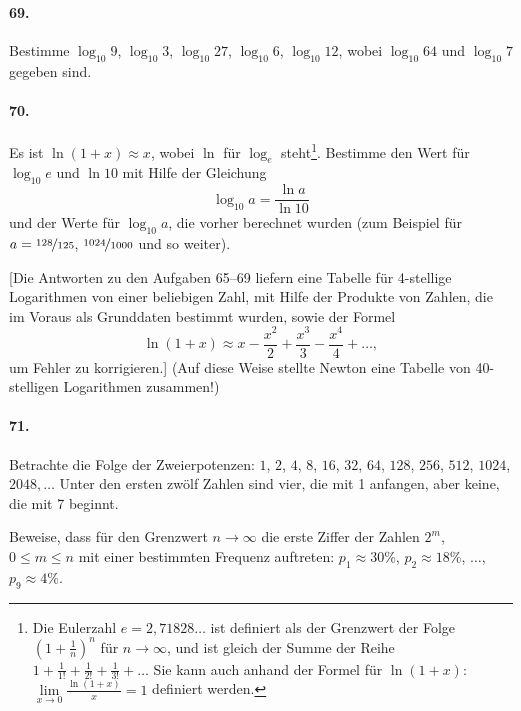 \documentclass[10pt,a5paper,twoside]{article}
\newenvironment{problem}[1]{\paragraph*{#1}}{}
\begin{document}
\begin{problem}{69.}
	Bestimme $\log_{10} 9$, $\log_{10} 3$, $\log_{10} 27$, $\log_{10} 6$, $\log_{10} 12$, wobei $\log_{10} 64$ und $\log_{10} 7$ gegeben sind.
\end{problem}

\begin{problem}{70.}
	Es ist $\ln (1+x) \approx x$, wobei $\ln$ für $\log_e$ steht\footnote{Die Eulerzahl $e = 2{,}71828\dots$ ist definiert als der Grenzwert der Folge $\left(1+\frac1n\right)^n$ für $n\to \infty$, und ist gleich der Summe der Reihe 
	$1+\frac 1{1!} +\frac 1{2!}+\frac 1{3!}+\dots{}$ Sie kann auch anhand der Formel für $\ln (1+x)$: $\lim\limits_{x\to 0}\frac{\ln(1+x)}{x} = 1$ definiert werden.}. Bestimme den Wert für $\log_{10} e$ und $\ln 10$ mit Hilfe der Gleichung 
	\begin{equation*}
	\log_{10} a=\frac{\ln a}{\ln 10}
	\end{equation*} 
	und der Werte für $\log_{10} a$, die vorher berechnet wurden (zum Beispiel für $a=\nicefrac{128}{125}$, $\nicefrac{1024}{1000}$ und so weiter).
	
	[Die Antworten zu den Aufgaben 65--69 liefern eine Tabelle für 4-stellige Logarithmen von einer beliebigen Zahl, mit Hilfe der Produkte von Zahlen, die im Voraus als Grunddaten bestimmt wurden, sowie der Formel 
	\begin{equation*}
	\ln (1+x) \approx x-\frac{x^2}{2}+\frac{x^3}{3}-\frac{x^4}{4}+\dots,
	\end{equation*}
	um Fehler zu korrigieren.] (Auf diese Weise stellte Newton eine Tabelle von 40-stelligen Logarithmen zusammen!)
\end{problem}

\begin{problem}{71.}
	Betrachte die Folge der Zweierpotenzen: $1$, $2$, $4$, $8$, $16$, $32$, $64$, $128$, $256$, $512$, $1024$, $2048, \dots$ Unter den ersten zwölf Zahlen sind vier, die mit 1 anfangen, aber keine, die mit 7 beginnt. 

	Beweise, dass für den Grenzwert $n \to \infty$ die erste Ziffer der Zahlen $2^m$,
	$0\leqslant m \leqslant n$ mit einer bestimmten Frequenz auftreten: 
	$p_1 \approx 30\%$, $p_2 \approx 18\%$, $\dots$, $p_9 \approx 4\%$.
\end{problem}
\end{document}
